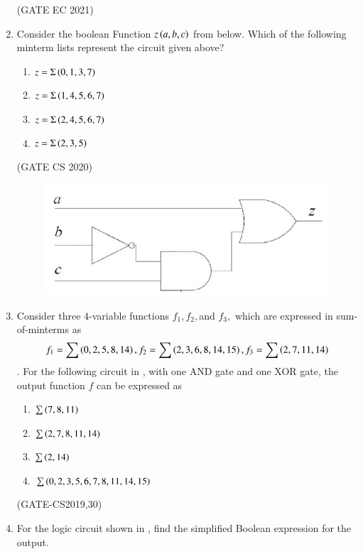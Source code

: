 \begin{enumerate}[label=\arabic*.,ref=\theenumi]
\hfill(GATE EC 2021)  
\begin{figure}[H]
	\centering
	\resizebox{0.75\columnwidth}{!}{

	}
\caption{} 
\label{fig:block_diagram}
\end{figure}
\item Consider the boolean Function $z\left(a,b,c\right)$ from 
			 below.
		Which of the following minterm lists represent the circuit given above?
	\begin{enumerate}
		\item $z=\Sigma\left(0,1,3,7\right)$
		\item $z=\Sigma\left(1,4,5,6,7\right)$
		\item $z=\Sigma\left(2,4,5,6,7\right)$
		\item $z=\Sigma\left(2,3,5\right)$
	\end{enumerate}	   
	\hfill{(GATE CS 2020)}
%	
		\begin{figure}[H]
			\centering
			\includegraphics[width=0.5\columnwidth]{figs/203.png}
			\caption{}
			\label{fig:203}
		\end{figure}
%
\item Consider three $4$-variable functions $f_1, f_2, $and $f_3,$ which are expressed in sum-of-minterms as 
$$f_1 = \sum\left(0,2,5,8,14\right), f_2=\sum\left(2,3,6,8,14,15\right), f_3 = \sum\left(2,7,11,14\right)$$. For the following circuit 
	in 
	,
	with one AND gate and one XOR gate, the output function $f$ can be expressed as
		\begin{enumerate}
		\item $\sum\left(7,8,11\right)$
		\item $\sum\left(2,7,8,11,14\right)$
		\item $\sum\left(2,14\right)$
		\item $\sum\left(0,2,3,5,6,7,8,11,14,15\right)$
		\end{enumerate}
%
	\hfill(GATE-CS2019,30)
	\begin{figure}[H]
		 \centering
		 \resizebox{0.5\columnwidth}{!}{%
			
			}
                 \caption{}
	\label{fig:GATE-CS2019,30}
	\end{figure}
\item For the logic circuit shown in , find the simplified Boolean expression for the output. 

\end{enumerate}
